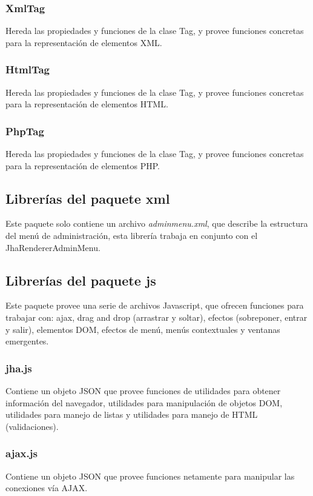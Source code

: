 \subsubsection{XmlTag}
Hereda las propiedades y funciones de la clase Tag, y provee funciones concretas para la representaci\'on de elementos XML.

\subsubsection{HtmlTag}
Hereda las propiedades y funciones de la clase Tag, y provee funciones concretas para la representaci\'on de elementos HTML.

\subsubsection{PhpTag}
Hereda las propiedades y funciones de la clase Tag, y provee funciones concretas para la representaci\'on de elementos PHP.

\subsection{Librer\'ias del paquete \textsf{xml}}
Este paquete solo contiene un archivo \textit{adminmenu.xml}, que describe la estructura del men\'u de administraci\'on, esta librer\'ia trabaja en conjunto con el JhaRendererAdminMenu.

\subsection{Librer\'ias del paquete \textsf{js}}
Este paquete provee una serie de archivos Javascript, que ofrecen funciones para trabajar con: ajax, drag and drop (arrastrar y soltar), efectos (sobreponer, entrar y salir), elementos DOM, efectos de men\'u, men\'us contextuales y ventanas emergentes.

\subsubsection{jha.js}
Contiene un objeto JSON que provee funciones de utilidades para obtener informaci\'on del navegador, utilidades para manipulaci\'on de objetos DOM, utilidades para manejo de listas y utilidades para manejo de HTML (validaciones).

\subsubsection{ajax.js}
Contiene un objeto JSON que provee funciones netamente para manipular las conexiones v\'ia AJAX.

